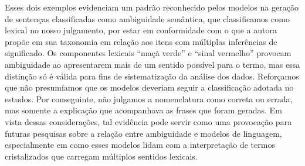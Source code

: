 Esses dois exemplos evidenciam um padrão reconhecido pelos modelos na geração de sentenças classificadas como ambiguidade semântica, que classificamos como lexical no nosso julgamento, por estar em conformidade com o que a autora propõe em sua taxonomia em relação aos itens com múltiplas inferências de significado. Os componentes lexicais \enquote{maçã verde} e \enquote{sinal vermelho} provocam ambiguidade ao apresentarem mais de um sentido possível para o termo, mas essa distinção só é válida para fins de sistematização da análise dos dados. Reforçamos que não presumíamos que os modelos deveriam seguir a classificação adotada no estudos. Por conseguinte, não julgamos a nomenclatura como correta ou errada, mas somente a explicação que acompanhava as frases que foram geradas. Em vista dessas considerações, tal evidência pode servir como uma provocação para futuras pesquisas sobre a relação entre ambiguidade e modelos de linguagem, especialmente em como esses modelos lidam com a interpretação de termos cristalizados que carregam múltiplos sentidos lexicais.